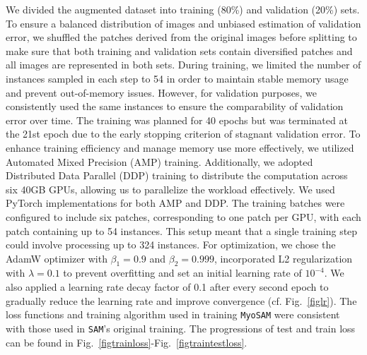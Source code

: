 We divided the augmented dataset into training (80\%) and validation (20\%) sets. To ensure a balanced distribution of images and unbiased estimation of validation error, we shuffled the patches derived from the original images before splitting to make sure that both training and validation sets contain diversified patches and all images are represented in both sets.
During training, we limited the number of instances sampled in each step to 54 in order to maintain stable memory usage and prevent out-of-memory issues. However, for validation purposes, we consistently used the same instances to ensure the comparability of validation error over time. The training was planned for 40 epochs but was terminated at the 21st epoch due to the early stopping criterion of stagnant validation error.
To enhance training efficiency and manage memory use more effectively, we utilized Automated Mixed Precision (AMP) training. Additionally, we adopted Distributed Data Parallel (DDP) training to distribute the computation across six 40GB GPUs, allowing us to parallelize the workload effectively. We used PyTorch \cite{paszke2019pytorch} implementations for both AMP and DDP. The training batches were configured to include six patches, corresponding to one patch per GPU, with each patch containing up to 54 instances. This setup meant that a single training step could involve processing up to 324 instances.
For optimization, we chose the AdamW optimizer with $\beta_1 = 0.9$ and $\beta_2 = 0.999$, incorporated L2 regularization with $\lambda = 0.1$ to prevent overfitting and set an initial learning rate of $10^{-4}$. We also applied a learning rate decay factor of 0.1 after every second epoch to gradually reduce the learning rate and improve convergence (cf. Fig.~\ref{figlr}). The loss functions and training algorithm used in training \texttt{MyoSAM} were consistent with those used in \texttt{SAM}'s original training. The progressions of test and train loss can be found in Fig.~\ref{figtrainloss}-Fig.~\ref{figtraintestloss}.

